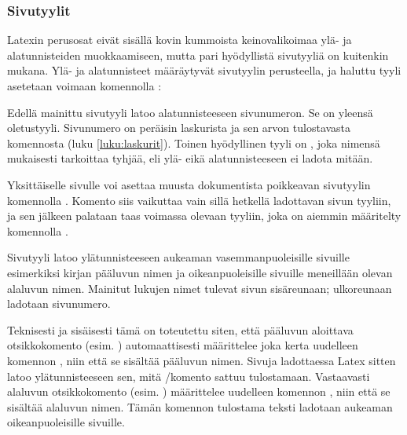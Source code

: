 \subsubsection{Sivutyylit}

Latexin perusosat eivät sisällä kovin kummoista keinovalikoimaa ylä- ja
alatunnisteiden muokkaamiseen, mutta pari hyödyllistä sivutyyliä on
kuitenkin mukana. Ylä- ja alatunnisteet määräytyvät sivutyylin
perusteella, ja haluttu tyyli asetetaan voimaan komennolla
:

\begin{koodilohkosis}
  \pagestyle{plain}
\end{koodilohkosis}

Edellä mainittu sivutyyli  latoo alatunnisteeseen
sivunumeron. Se on yleensä oletustyyli. Sivunumero on peräisin
laskurista  ja sen arvon tulostavasta komennosta
 (luku \ref{luku:laskurit}). Toinen hyödyllinen tyyli
on , joka nimensä mukaisesti tarkoittaa tyhjää, eli ylä-
eikä alatunnisteeseen ei ladota mitään.

Yksittäiselle sivulle voi asettaa muusta dokumentista poikkeavan
sivutyylin komennolla . Komento siis vaikuttaa
vain sillä hetkellä ladottavan sivun tyyliin, ja sen jälkeen palataan
taas voimassa olevaan tyyliin, joka on aiemmin määritelty komennolla
.

\begin{koodilohkosis}
  \thispagestyle{empty}
\end{koodilohkosis}

Sivutyyli  latoo ylätunnisteeseen aukeaman
vasemmanpuoleisille sivuille esimerkiksi kirjan pääluvun nimen ja
oikeanpuoleisille sivuille meneillään olevan alaluvun nimen. Mainitut
lukujen nimet tulevat sivun sisäreunaan; ulkoreunaan ladotaan
sivunumero.

Teknisesti ja sisäisesti tämä on toteutettu siten, että pääluvun
aloittava otsikkokomento (esim. ) automaattisesti
määrittelee joka kerta uudelleen komennon , niin että
se sisältää pääluvun nimen. Sivuja ladottaessa Latex sitten latoo
ylätunnisteeseen sen, mitä \-/komento sattuu
tulostamaan. Vastaavasti alaluvun otsikkokomento (esim.
) määrittelee uudelleen komennon ,
niin että se sisältää alaluvun nimen. Tämän komennon tulostama teksti
ladotaan aukeaman oikeanpuoleisille sivuille.

